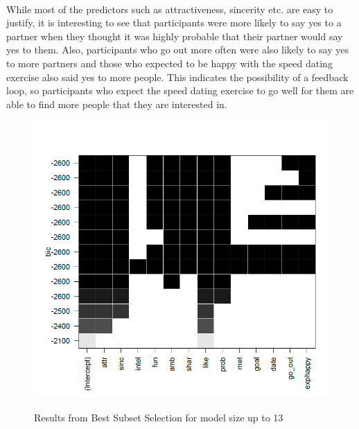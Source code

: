\documentclass{article}
\begin{document}
\null\\
While most of the predictors such as attractiveness, sincerity etc. are easy to justify, it is interesting to see that participants were more likely to say yes to a partner when they thought it was highly probable that their partner would say yes to them. Also, participants who go out more often were also likely to say yes to more partners and those who expected to be happy with the speed dating exercise also said yes to more people. This indicates the possibility of a feedback loop, so participants who expect the speed dating exercise to go well for them are able to find more people that they are interested in.
\begin{figure}[H]
	\caption{Results from Best Subset Selection for model size up to 13}
	\includegraphics[scale=0.60]{bestsubsets}
	\centering
	\label{fig:bestsubset}
\end{figure}
%
\end{document}
